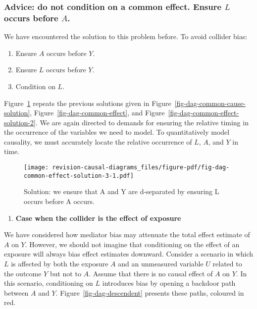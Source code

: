 \documentclass[
  singlecolumn,
  9pt]{article}
\providecommand{\tightlist}{%
  \setlength{\itemsep}{0pt}\setlength{\parskip}{0pt}}\usepackage{longtable,booktabs,array}
\begin{document}
\subsubsection{\texorpdfstring{Advice: do not condition on a common
effect. Ensure \(L\) occurs before
\(A\).}{Advice: do not condition on a common effect. Ensure L occurs before A.}}\label{advice-do-not-condition-on-a-common-effect.-ensure-l-occurs-before-a.}

We have encountered the solution to this problem before. To avoid
collider bias:

\begin{enumerate}
\def\labelenumi{\arabic{enumi}.}
\tightlist
\item
  Ensure \(A\) occurs before \(Y\).
\item
  Ensure \(L\) occurs before \(Y\).
\item
  Condition on \(L\).
\end{enumerate}

Figure~\ref{fig-dag-common-effect-solution-3} repeats the previous
solutions given in Figure~\ref{fig-dag-common-cause-solution},
Figure~\ref{fig-dag-common-effect}, and
Figure~\ref{fig-dag-common-effect-solution-2}. We are again directed to
demands for ensuring the relative timing in the occurrence of the
variables we need to model. To quantitatively model causality, we must
accurately locate the relative occurrence of \(L\), \(A\), and \(Y\) in
time.

\begin{figure}

{\centering \texttt{[image: revision-causal-diagrams\_files/figure-pdf/fig-dag-common-effect-solution-3-1.pdf]}

}

\caption{\label{fig-dag-common-effect-solution-3}Solution: we ensure
that A and Y are d-separated by ensuring L occurs before A occurs.}

\end{figure}

\begin{enumerate}
\def\labelenumi{\arabic{enumi}.}
\setcounter{enumi}{1}
\tightlist
\item
  \textbf{Case when the collider is the effect of exposure}
\end{enumerate}

We have considered how mediator bias may attenuate the total effect
estimate of \(A\) on \(Y\). However, we should not imagine that
conditioning on the effect of an exposure will always bias effect
estimates downward. Consider a scenario in which \(L\) is affected by
both the exposure \(A\) and an unmeasured variable \(U\) related to the
outcome \(Y\) but not to \(A\). Assume that there is no causal effect of
\(A\) on \(Y\). In this scenario, conditioning on \(L\) introduces bias
by opening a backdoor path between \(A\) and \(Y\).
Figure~\ref{fig-dag-descendent} presents these paths, coloured in red.
\end{document}

